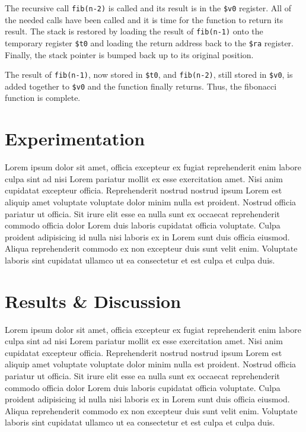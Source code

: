 \documentclass[11pt]{report}
\begin{document}
The recursive call \verb|fib(n-2)| is called and its result is in the \verb|$v0| register. All of
the needed calls have been called and it is time for the function to return its result. The stack is
restored by loading the result of \verb|fib(n-1)| onto the temporary register \verb|$t0| and loading
the return address back to the \verb|$ra| register. Finally, the stack pointer is bumped back up to
its original position.

The result of \verb|fib(n-1)|, now stored in \verb|$t0|, and \verb|fib(n-2)|, still stored in
\verb|$v0|, is added together to \verb|$v0| and the function finally returns. Thus, the fibonacci
function is complete.



\section*{Experimentation}
Lorem ipsum dolor sit amet, officia excepteur ex fugiat reprehenderit enim labore culpa sint ad nisi
Lorem pariatur mollit ex esse exercitation amet. Nisi anim cupidatat excepteur officia.
Reprehenderit nostrud nostrud ipsum Lorem est aliquip amet voluptate voluptate dolor minim nulla est
proident. Nostrud officia pariatur ut officia. Sit irure elit esse ea nulla sunt ex occaecat
reprehenderit commodo officia dolor Lorem duis laboris cupidatat officia voluptate. Culpa proident
adipisicing id nulla nisi laboris ex in Lorem sunt duis officia eiusmod. Aliqua reprehenderit
commodo ex non excepteur duis sunt velit enim. Voluptate laboris sint cupidatat ullamco ut ea
consectetur et est culpa et culpa duis.

\newpage

\section*{Results \& Discussion}
Lorem ipsum dolor sit amet, officia excepteur ex fugiat reprehenderit enim labore culpa sint ad nisi
Lorem pariatur mollit ex esse exercitation amet. Nisi anim cupidatat excepteur officia.
Reprehenderit nostrud nostrud ipsum Lorem est aliquip amet voluptate voluptate dolor minim nulla est
proident. Nostrud officia pariatur ut officia. Sit irure elit esse ea nulla sunt ex occaecat
reprehenderit commodo officia dolor Lorem duis laboris cupidatat officia voluptate. Culpa proident
adipisicing id nulla nisi laboris ex in Lorem sunt duis officia eiusmod. Aliqua reprehenderit
commodo ex non excepteur duis sunt velit enim. Voluptate laboris sint cupidatat ullamco ut ea
consectetur et est culpa et culpa duis.
\end{document}
